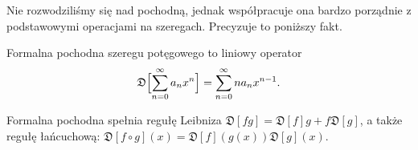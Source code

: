Nie rozwodziliśmy się nad pochodną, jednak współpracuje ona bardzo porządnie z podstawowymi operacjami na szeregach.
Precyzuje to poniższy fakt.

\begin{definicja}
	Formalna pochodna szeregu potęgowego to liniowy operator
	\[
		\mathfrak D\Bigl[\sum_{n=0}^\infty a_n x^n\Bigr] = \sum_{n=0}^\infty n a_n x^{n-1}.
	\]
\end{definicja}


\begin{fakt}
	Formalna pochodna spełnia regułę Leibniza $\mathfrak D[fg] = \mathfrak D[f]g + f \mathfrak D[g]$, a także regułę łańcuchową: $\mathfrak D[f \circ g](x) = \mathfrak D [f](g(x)) \mathfrak D [g](x)$.
\end{fakt}